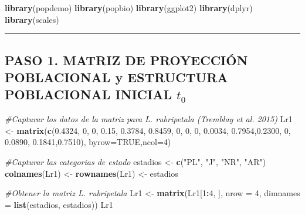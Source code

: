 \documentclass[
]{book}
\newenvironment{Shaded}{\begin{snugshade}}{\end{snugshade}}
\newcommand{\AttributeTok}[1]{\textcolor[rgb]{0.13,0.29,0.53}{#1}}
\newcommand{\CommentTok}[1]{\textcolor[rgb]{0.56,0.35,0.01}{\textit{#1}}}
\newcommand{\ConstantTok}[1]{\textcolor[rgb]{0.56,0.35,0.01}{#1}}
\newcommand{\DecValTok}[1]{\textcolor[rgb]{0.00,0.00,0.81}{#1}}
\newcommand{\FloatTok}[1]{\textcolor[rgb]{0.00,0.00,0.81}{#1}}
\newcommand{\FunctionTok}[1]{\textcolor[rgb]{0.13,0.29,0.53}{\textbf{#1}}}
\newcommand{\NormalTok}[1]{#1}
\newcommand{\OtherTok}[1]{\textcolor[rgb]{0.56,0.35,0.01}{#1}}
\newcommand{\SpecialCharTok}[1]{\textcolor[rgb]{0.81,0.36,0.00}{\textbf{#1}}}
\newcommand{\StringTok}[1]{\textcolor[rgb]{0.31,0.60,0.02}{#1}}
\theoremstyle{definition}
\theoremstyle{definition}
\theoremstyle{definition}
\theoremstyle{definition}
\theoremstyle{remark}
\begin{document}
\begin{Shaded}
\begin{Highlighting}[]
\FunctionTok{library}\NormalTok{(popdemo)}
\FunctionTok{library}\NormalTok{(popbio)}
\FunctionTok{library}\NormalTok{(ggplot2)}
\FunctionTok{library}\NormalTok{(dplyr)}
\FunctionTok{library}\NormalTok{(scales)}
\end{Highlighting}
\end{Shaded}

\begin{center}\rule{0.5\linewidth}{0.5pt}\end{center}

\subsection{\texorpdfstring{PASO 1. MATRIZ DE PROYECCIÓN POBLACIONAL y ESTRUCTURA POBLACIONAL INICIAL \(t_{0}\)}{PASO 1. MATRIZ DE PROYECCIÓN POBLACIONAL y ESTRUCTURA POBLACIONAL INICIAL t\_\{0\}}}\label{paso-1.-matriz-de-proyecciuxf3n-poblacional-y-estructura-poblacional-inicial-t_0}

\begin{Shaded}
\begin{Highlighting}[]
\CommentTok{\#Capturar los datos de la matriz para L. rubripetala (Tremblay et al. 2015)}
\NormalTok{Lr1 }\OtherTok{\textless{}{-}} \FunctionTok{matrix}\NormalTok{(}\FunctionTok{c}\NormalTok{(}\FloatTok{0.4324}\NormalTok{, }\DecValTok{0}\NormalTok{,      }\DecValTok{0}\NormalTok{,     }\FloatTok{0.15}\NormalTok{,}
               \FloatTok{0.3784}\NormalTok{, }\FloatTok{0.8459}\NormalTok{, }\DecValTok{0}\NormalTok{,     }\DecValTok{0}\NormalTok{,}
               \DecValTok{0}\NormalTok{,      }\FloatTok{0.0034}\NormalTok{, }\FloatTok{0.7954}\NormalTok{,}\FloatTok{0.2300}\NormalTok{,}
               \DecValTok{0}\NormalTok{,      }\FloatTok{0.0890}\NormalTok{, }\FloatTok{0.1841}\NormalTok{,}\FloatTok{0.7510}\NormalTok{), }\AttributeTok{byrow=}\ConstantTok{TRUE}\NormalTok{,}\AttributeTok{ncol=}\DecValTok{4}\NormalTok{)}

\CommentTok{\#Capturar las categorias de estado}
\NormalTok{estadios }\OtherTok{\textless{}{-}} \FunctionTok{c}\NormalTok{(}\StringTok{"PL"}\NormalTok{, }\StringTok{"J"}\NormalTok{, }\StringTok{"NR"}\NormalTok{, }\StringTok{"AR"}\NormalTok{)}
\FunctionTok{colnames}\NormalTok{(Lr1) }\OtherTok{\textless{}{-}} \FunctionTok{rownames}\NormalTok{(Lr1) }\OtherTok{\textless{}{-}}\NormalTok{ estadios}

\CommentTok{\#Obtener la matriz L. rubripetala }
\NormalTok{Lr1 }\OtherTok{\textless{}{-}} \FunctionTok{matrix}\NormalTok{(Lr1[}\DecValTok{1}\SpecialCharTok{:}\DecValTok{4}\NormalTok{, ], }\AttributeTok{nrow =} \DecValTok{4}\NormalTok{, }\AttributeTok{dimnames =} \FunctionTok{list}\NormalTok{(estadios, estadios))}
\NormalTok{Lr1}
\end{Highlighting}
\end{Shaded}
\end{document}
